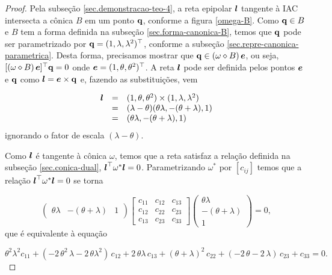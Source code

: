 \begin{proof}

Pela subseção \ref{sec.demonstracao-teo-4}, a reta epipolar $\boldsymbol{l}$ tangente à IAC intersecta a cônica $B$ em um ponto ${\bf q}$, conforme a figura \ref{omega-B}. Como ${\bf q}\in B$ e $B$ tem a forma definida na subseção \ref{sec.forma-canonica-B}, temos que ${\bf q}$ pode ser parametrizado por ${\bf q}=(1,\lambda,\lambda^2)^\top$, conforme a subseção \ref{sec.repre-canonica-parametrica}. Desta forma, precisamos mostrar que ${\bf q}\in (\omega\diamond B)\,\boldsymbol{e}$, ou seja, $[(\omega\diamond B)\,\boldsymbol{e}]^\top {\bf q}=0$ onde $\boldsymbol{e}=(1,\theta,\theta^2)^\top$. A reta $\boldsymbol{l}$ pode ser definida pelos pontos $\boldsymbol{e}$ e ${\bf q}$ como $\boldsymbol{l}=\boldsymbol{e}\times {\bf q}$ e, fazendo as substituições, vem

\begin{equation*}
\begin{array}{rcl}
\boldsymbol{l}&=&(1,\theta ,\theta^2)\times (1,\lambda,\lambda^2)\\
&=&(\lambda -\theta)(\theta\lambda,-(\theta+\lambda),1)\\
&=&(\theta\lambda,-(\theta+\lambda),1)
\end{array}
\end{equation*}
ignorando o fator de escala $(\lambda-\theta)$.

Como $\boldsymbol{l}$ é tangente à cônica $\omega$, temos que a reta satisfaz a relação definida na subseção \ref{sec.conica-dual}, $\boldsymbol{l}^\top\omega^*\boldsymbol{l}=0$. Parametrizando $\omega^*$ por $[c_{ij}]$ temos que a relação $\boldsymbol{l}^\top\omega^*\boldsymbol{l}=0$ se torna

\begin{equation*}
\begin{pmatrix}
\theta\lambda&-(\theta+\lambda)&1
\end{pmatrix}
\begin{bmatrix}
c_{11}&c_{12}&c_{13}\\
c_{12}&c_{22}&c_{23}\\
c_{13}&c_{23}&c_{33}
\end{bmatrix}
\begin{pmatrix}
\theta\lambda\\
-(\theta+\lambda)\\
1
\end{pmatrix}
=0,
\end{equation*}  
que é equivalente à equação

\begin{equation}\label{eq.expandida-omega-dual}
\theta^2\lambda^2 c_{11}+(-2\,\theta^2\,\lambda-2\,\theta\lambda^2)\,c_{12}+2\,\theta\lambda\,c_{13}+(\theta+\lambda)^2\,c_{22}+(-2\,\theta-2\,\lambda)\,c_{23}+c_{33}=0.
\end{equation} 


\end{proof}

